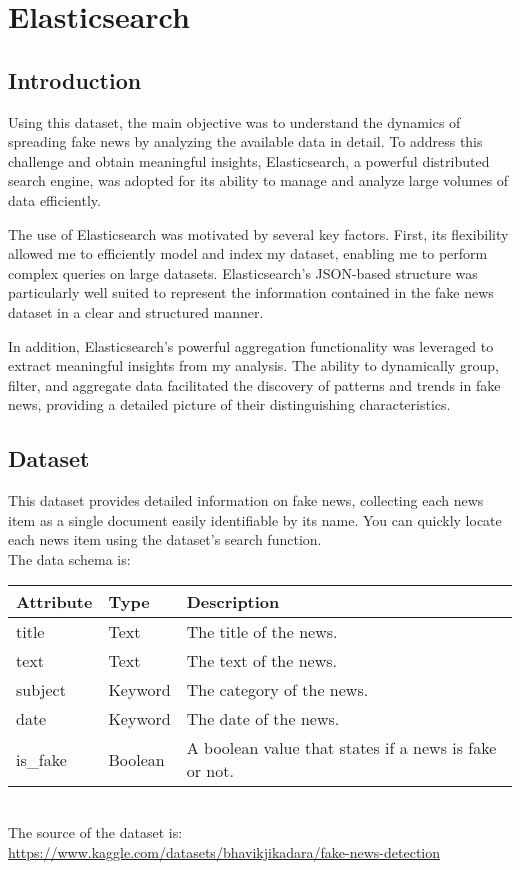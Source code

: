 \chapter{Elasticsearch}
\label{ch:mongodb}%

\section{Introduction}
Using this dataset, the main objective was to understand the dynamics of spreading fake news by analyzing the available data in detail. To address this challenge and obtain meaningful insights, Elasticsearch, a powerful distributed search engine, was adopted for its ability to manage and analyze large volumes of data efficiently.

The use of Elasticsearch was motivated by several key factors. First, its flexibility allowed me to efficiently model and index my dataset, enabling me to perform complex queries on large datasets. Elasticsearch's JSON-based structure was particularly well suited to represent the information contained in the fake news dataset in a clear and structured manner.

In addition, Elasticsearch's powerful aggregation functionality was leveraged to extract meaningful insights from my analysis. The ability to dynamically group, filter, and aggregate data facilitated the discovery of patterns and trends in fake news, providing a detailed picture of their distinguishing characteristics.

\section{Dataset}
This dataset provides detailed information on fake news, collecting each news item as a single document easily identifiable by its name. You can quickly locate each news item using the dataset's search function. \\
The data schema is: 
\begin{table}[h!]
	\begin{center}
		\begin{tabular}{|m{6em}|m{4em}|m{20em}|}
		\hline
		\textbf{Attribute} & \textbf{Type} & \textbf{Description}\\
		\hline
			title & Text & The title of the news.\\
		\hline
			text & Text & The text of the news.\\
            \hline
			subject & Keyword & The category of the news.\\
		\hline
                date & Keyword & The date of the news.\\
            \hline
                is\_fake & Boolean & A boolean value that states if a news is fake or not.\\
            \hline
		\end{tabular}
	\end{center}
\end{table}
\\
The source of the dataset is:\\
\url{https://www.kaggle.com/datasets/bhavikjikadara/fake-news-detection}
\newpage
